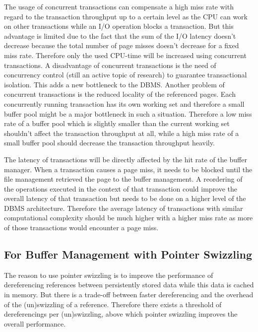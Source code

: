     The usage of concurrent transactions can compensate a high miss rate with regard to the transaction throughput up to a certain level as the CPU can work on other transactions while an I/O operation blocks a transaction. But this advantage is limited due to the fact that the sum of the I/O latency doesn't decrease because the total number of page misses doesn't decrease for a fixed miss rate. Therefore only the used CPU-time will be increased using concurrent transactions. A disadvantage of concurrent transactions is the need of concurrency control (still an active topic of research) to guarantee transactional isolation. This adds a new bottleneck to the DBMS. Another problem of concurrent transactions is the reduced locality of the referenced pages. Each concurrently running transaction has its own working set and therefore a small buffer pool might be a major bottleneck in such a situation. Therefore a low miss rate of a buffer pool which is slightly smaller than the current working set shouldn't affect the transaction throughput at all, while a high miss rate of a small buffer pool should decrease the transaction throughput heavily.

    The latency of transactions will be directly affected by the hit rate of the buffer manager. When a transaction causes a page miss, it needs to be blocked until the file management retrieved the page to the buffer management. A reordering of the operations executed in the context of that transaction could improve the overall latency of that transaction but needs to be done on a higher level of the DBMS architecture. Therefore the average latency of transactions with similar computational complexity should be much higher with a higher miss rate as more of those transactions would encounter a page miss.

\subsection{For Buffer Management with Pointer Swizzling}

    The reason to use pointer swizzling is to improve the performance of dereferencing references between persistently stored data while this data is cached in memory. But there is a trade-off between faster dereferencing and the overhead of the (un)swizzling of a reference. Therefore there exists a threshold of dereferencings per (un)swizzling, above which pointer swizzling improves the overall performance.

